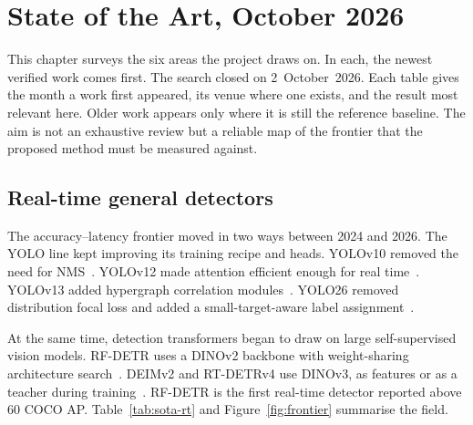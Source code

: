 \chapter{State of the Art, October 2026}
\label{ch:sota}

This chapter surveys the six areas the project draws on. In each, the newest
verified work comes first. The search closed on 2~October~2026. Each table
gives the month a work first appeared, its venue where one exists, and the
result most relevant here. Older work appears only where it is still the
reference baseline. The aim is not an exhaustive review but a reliable map
of the frontier that the proposed method must be measured against.

\section{Real-time general detectors}
\label{sec:sota-rt}

The accuracy--latency frontier moved in two ways between 2024 and 2026. The
YOLO line kept improving its training recipe and heads. YOLOv10 removed the
need for NMS~\citep{wang2024yolov10}. YOLOv12 made attention efficient
enough for real time~\citep{tian2025yolov12}. YOLOv13 added hypergraph
correlation modules~\citep{lei2025yolov13}. YOLO26 removed distribution focal
loss and added a small-target-aware label assignment~\citep{yolo26_2026}.

At the same time, detection transformers began to draw on large
self-supervised vision models. RF-DETR uses a DINOv2 backbone with weight-sharing
architecture search~\citep{robinson2025rfdetr,oquab2024dinov2}. DEIMv2 and
RT-DETRv4 use DINOv3, as features or as a teacher during
training~\citep{deimv2_2025,rtdetrv4_2025,simeoni2025dinov3}. RF-DETR is the
first real-time detector reported above 60 COCO AP. Table~\ref{tab:sota-rt}
and Figure~\ref{fig:frontier} summarise the field.

